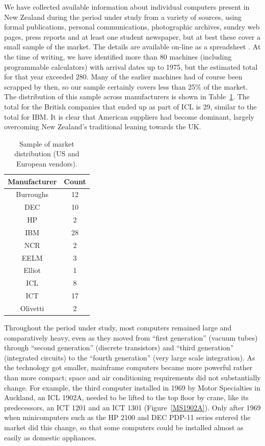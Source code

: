 \documentclass{IEEEcsmag}
\begin{document}
We have collected available information about individual computers present in New Zealand during the period under study from a
\cbstart
variety of sources, using formal publications, personal communications, photographic archives, sundry web pages, press reports and at least one student newspaper, but at best these cover a small sample of the market.
The details are available on-line as a spreadsheet \cite{SpreadsheetNZ}.
At the time of writing, we have identified more than 80 machines (including programmable calculators) with arrival dates up to 1975, but the estimated total for that year exceeded 280. Many of the earlier machines had of course been scrapped by then, so our sample certainly covers less than 25\% of the market. The distribution of this sample across manufacturers is shown in Table~\ref{TotalManuf}. The total for the British companies that ended up as part of ICL is 29, similar to the total for IBM. It is clear that American suppliers had become dominant, largely overcoming New Zealand’s traditional leaning towards the UK.
\cbend
\begin{table}[h]
\begin{center}
\begin{tabular}{ |c|c| } 
 \hline
Manufacturer & Count\\ 
\hline
Burroughs & 12\\
DEC & 10\\
HP & 2\\
IBM & 28\\
NCR & 2\\
\hline
EELM & 3\\
Elliot & 1\\
ICL & 8\\
ICT & 17\\ 
Olivetti & 2\\
\hline
\end{tabular}
\vspace{1ex}
\caption{\label{TotalManuf}Sample of market distribution (US and European vendors).}
\end{center}
\end{table}

Throughout the period under study, most computers remained large and comparatively heavy, even as they moved from “first generation” (vacuum tubes) through “second generation” (discrete transistors) and “third generation” (integrated circuits) to the “fourth generation” (very large scale integration). As the technology got smaller, mainframe computers became more powerful rather than more compact; space and air conditioning requirements did not substantially change. For example, the third computer installed in 1969 by Motor Specialties in Auckland, an ICL 1902A, needed to be lifted to the top floor by crane, like its predecessors, an ICT 1201 and an ICT 1301 (Figure~\ref{MS1902A}). Only after 1969 when minicomputers such as the HP 2100 and DEC PDP-11 series entered the market did this change, so that some computers could be installed almost as easily as domestic appliances.
\end{document}
